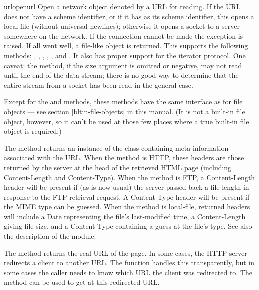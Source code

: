 \begin{funcdesc}{urlopen}{url}
Open a network object denoted by a URL for reading.  If the URL does
not have a scheme identifier, or if it has  as its scheme
identifier, this opens a local file (without universal newlines);
otherwise it opens a socket to a server somewhere on the network.  If
the connection cannot be made
the  exception is raised.  If all went well, a
file-like object is returned.  This supports the following methods:
, , , ,
,  and .  It also has
proper support for the iterator protocol.
One caveat: the  method, if the size argument is
omitted or negative, may not read until the end of the data stream;
there is no good way to determine that the entire stream from a socket
has been read in the general case.

Except for the  and  methods,
these methods have the same interface as for
file objects --- see section \ref{bltin-file-objects} in this
manual.  (It is not a built-in file object, however, so it can't be
used at those few places where a true built-in file object is
required.)

The  method returns an instance of the class
 containing meta-information associated
with the URL.  When the method is HTTP, these headers are those
returned by the server at the head of the retrieved HTML page
(including Content-Length and Content-Type).  When the method is FTP,
a Content-Length header will be present if (as is now usual) the
server passed back a file length in response to the FTP retrieval
request. A Content-Type header will be present if the MIME type can
be guessed.  When the method is local-file, returned headers will include
a Date representing the file's last-modified time, a Content-Length
giving file size, and a Content-Type containing a guess at the file's
type. See also the description of the
 module.

The  method returns the real URL of the page.  In
some cases, the HTTP server redirects a client to another URL.  The
 function handles this transparently, but in some
cases the caller needs to know which URL the client was redirected
to.  The  method can be used to get at this
redirected URL.


\end{funcdesc}
